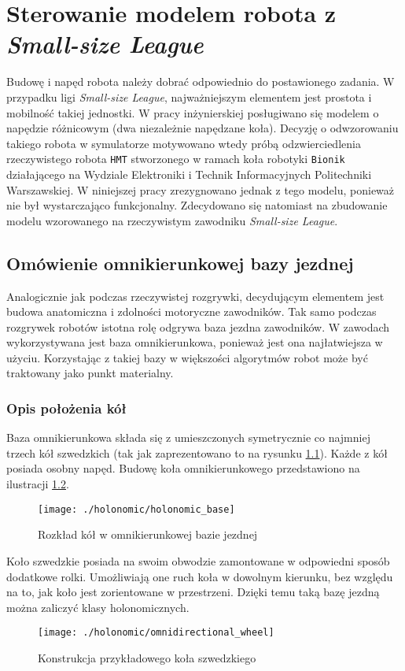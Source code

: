 \chapter[Sterowanie modelem robota z \emph{Small-size League}]{Sterowanie modelem robota z \emph{Small-size League} \label{chap:holonomic}}
Budowę i napęd robota należy dobrać odpowiednio do postawionego zadania. W przypadku ligi \emph{Small-size League}, najważniejszym elementem jest prostota i mobilność
takiej jednostki. W pracy inżynierskiej \cite{inzynierka} posługiwano się  modelem o napędzie różnicowym (dwa niezależnie napędzane koła). Decyzję o odwzorowaniu takiego robota
w symulatorze motywowano wtedy próbą odzwierciedlenia rzeczywistego robota \texttt{HMT} \cite{hamada_mgr} stworzonego w ramach koła robotyki \texttt{Bionik} działającego na Wydziale Elektroniki i Technik Informacyjnych Politechniki
Warszawskiej. W niniejszej pracy zrezygnowano jednak z tego modelu, ponieważ nie był wystarczająco funkcjonalny. Zdecydowano się natomiast na zbudowanie modelu wzorowanego na rzeczywistym zawodniku \emph{Small-size League}.  
\section{Omówienie omnikierunkowej bazy jezdnej}
Analogicznie jak podczas rzeczywistej rozgrywki, decydującym elementem jest budowa anatomiczna i zdolności motoryczne zawodników. Tak samo podczas
rozgrywek robotów istotna rolę odgrywa baza jezdna zawodników.  W zawodach wykorzystywana jest baza omnikierunkowa, ponieważ jest ona najłatwiejsza w użyciu. Korzystając z takiej bazy w
większości algorytmów robot może być traktowany jako punkt materialny.
\subsection{Opis położenia kół}
Baza omnikierunkowa składa się z umieszczonych symetrycznie co najmniej trzech kół szwedzkich (tak jak zaprezentowano to na rysunku \ref{fig:holonomic_base}).
Każde z kół posiada osobny napęd. Budowę koła omnikierunkowego przedstawiono na ilustracji \ref{fig:omnidirectional_wheel}. 
\begin{figure}[h!]
\centering
\texttt{[image: ./holonomic/holonomic\_base]}
\caption{ Rozkład kół w omnikierunkowej bazie jezdnej }\label{fig:holonomic_base}
\end{figure}
Koło szwedzkie posiada na swoim obwodzie zamontowane w odpowiedni sposób dodatkowe rolki. Umożliwiają one ruch koła w dowolnym kierunku, bez względu na to, 
jak koło jest zorientowane w przestrzeni. Dzięki temu taką bazę jezdną można zaliczyć klasy holonomicznych.
\begin{figure}[h]
\centering
\texttt{[image: ./holonomic/omnidirectional\_wheel]}
\caption{ Konstrukcja przykładowego koła szwedzkiego }\label{fig:omnidirectional_wheel}
\end{figure}
